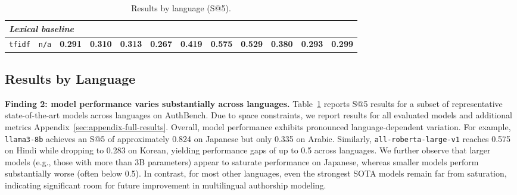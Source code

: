 \documentclass[11pt]{article}
\begin{document}
\begin{table}[h!]
{\begin{tabular}{lccccccccccc}
\midrule
\multicolumn{12}{l}{\textit{Lexical baseline}} \\
\midrule
\texttt{tfidf} & \texttt{n/a} & \textbf{0.291} & \textbf{0.310} & \textbf{0.313} & \textbf{0.267} & \textbf{0.419} & \textbf{0.575} & \textbf{0.529} & \textbf{0.380} & \textbf{0.293} & \textbf{0.299} \\
\bottomrule
\end{tabular}
}
\caption{Results by language (S@5).
}
\label{tab:lang-s10-top}
\end{table}

\subsection{Results by Language}
\textbf{Finding 2: model performance varies substantially across languages.}
Table~\ref{tab:lang-s10-top} reports S@5 results for a subset of representative state-of-the-art models across languages on AuthBench. Due to space constraints, we report results for all evaluated models and additional metrics Appendix~\ref{sec:appendix-full-results}. Overall, model performance exhibits pronounced language-dependent variation. For example, \texttt{llama3-8b} achieves an S@5 of approximately 0.824 on Japanese but only 0.335 on Arabic. Similarly, \texttt{all-roberta-large-v1} reaches 0.575 on Hindi while dropping to 0.283 on Korean, yielding performance gaps of up to 0.5 across languages. 
We further observe that larger models (e.g., those with more than 3B parameters) appear to saturate performance on Japanese, whereas smaller models perform substantially worse (often below 0.5). In contrast, for most other languages, even the strongest SOTA models remain far from saturation, indicating significant room for future improvement in multilingual authorship modeling.
\end{document}
